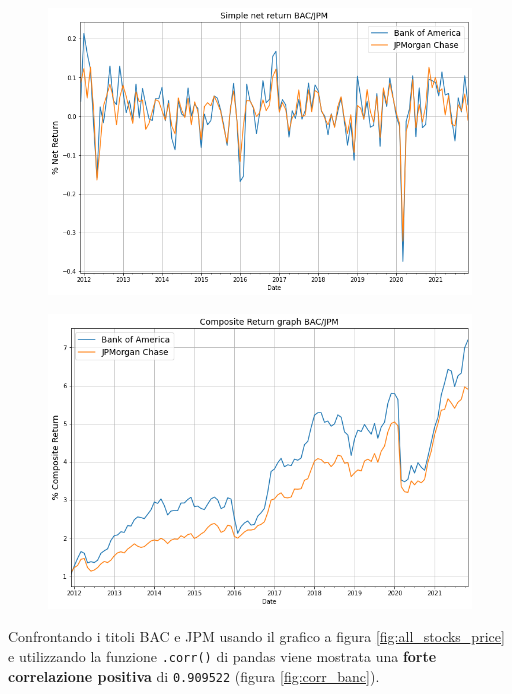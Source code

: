 \documentclass{article}
\begin{document}
\begin{figure}[h]
  \centering
  \begin{minipage}{.5\textwidth}
    \centering
    \includegraphics[width=1\linewidth]{banc_rendimenti_semplici_netti.png}
    \label{fig:rendimenti_semplici_banc}
  \end{minipage}%
  \begin{minipage}{.5\textwidth}
    \centering
    \includegraphics[width=.97\linewidth]{banc_rendimenti_composti.png}
    \label{fig:rendimenti_compositi_banc}
  \end{minipage}
\end{figure}

Confrontando i titoli BAC e JPM usando il grafico a figura \ref{fig:all_stocks_price} e utilizzando la funzione \verb|.corr()| di pandas
viene mostrata una \textbf{forte correlazione positiva} di \verb|0.909522| (figura \ref{fig:corr_banc}).
\end{document}
